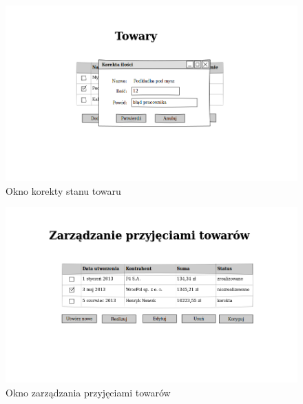 \begin{figure}[!htb]
  \begin{center}
    \includegraphics[scale=0.45]{../img/interfejs/korekta-ilosci-towaru.png}
  \end{center}
  \caption{Okno korekty stanu towaru}
\end{figure}
\FloatBarrier

\begin{figure}[!htb]
  \begin{center}
    \includegraphics[scale=0.45]{../img/interfejs/zarzadzanie-przyjeciami-towaru.png}
  \end{center}
  \caption{Okno zarządzania przyjęciami towarów}
\end{figure}
\FloatBarrier

